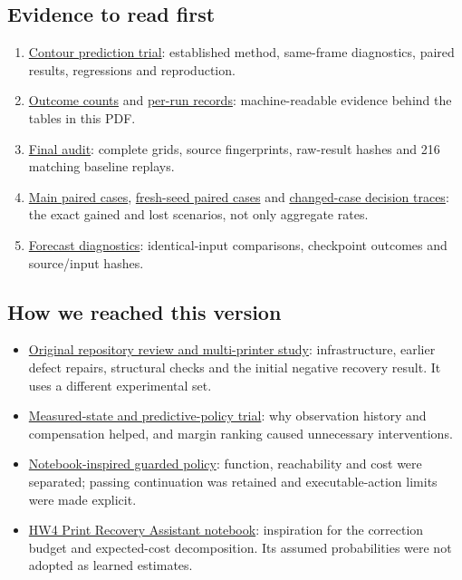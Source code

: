 \documentclass[10pt,letterpaper]{article}
\newcommand{\repourl}{https://github.com/3D-Printing-Failure-Detection/failure-detection/blob/work/neural-local-recovery}
\newcommand{\repo}[2]{\href{\repourl/#1}{#2}}
\begin{document}
\subsection*{Evidence to read first}
\begin{enumerate}
\item \repo{docs/contour-prediction-trial.md}{Contour prediction trial}: established
method, same-frame diagnostics, paired results, regressions and reproduction.
\item \repo{docs/validation/contour/outcomes.csv}{Outcome counts} and
\repo{docs/validation/contour/runs.csv}{per-run records}: machine-readable evidence
behind the tables in this PDF.
\item \repo{docs/validation/contour/audit.json}{Final audit}: complete grids,
source fingerprints, raw-result hashes and 216 matching baseline replays.
\item \repo{docs/validation/contour/contour-main-v1-paired.json}{Main paired cases},
\repo{docs/validation/contour/contour-heldout-v1-paired.json}{fresh-seed paired cases}
and \repo{docs/validation/contour/changed-cases.jsonl}{changed-case decision traces}:
the exact gained and lost scenarios, not only aggregate rates.
\item \repo{docs/validation/contour/forecast-diagnostics.json}{Forecast diagnostics}:
identical-input comparisons, checkpoint outcomes and source/input hashes.
\end{enumerate}

\subsection*{How we reached this version}
\begin{itemize}
\item \repo{docs/mujoco-report.md}{Original repository review and multi-printer
study}: infrastructure, earlier defect repairs, structural checks and the initial
negative recovery result. It uses a different experimental set.
\item \repo{docs/functional-policy-trial.md}{Measured-state and predictive-policy
trial}: why observation history and compensation helped, and margin ranking
caused unnecessary interventions.
\item \repo{docs/notebook-recovery-trial.md}{Notebook-inspired guarded policy}:
function, reachability and cost were separated; passing continuation was retained
and executable-action limits were made explicit.
\item \href{https://colab.research.google.com/drive/1qsvnBkzzJ74yCOGFyT7BJHdNe8Nc2IIN}{HW4 Print Recovery Assistant notebook}:
inspiration for the correction budget and expected-cost decomposition. Its
assumed probabilities were not adopted as learned estimates.
\end{itemize}
\end{document}
